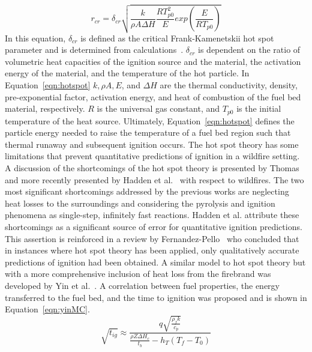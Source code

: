         \begin{equation}
            r_{cr} = \delta_{cr}\sqrt{\frac{k}{\rho A \Delta H}\frac{RT^{2}_{p0}}{E} exp\left(\frac{E}{RT_{p0}}  \right)}
            \label{eqn:hotspot}
        \end{equation}
    In this equation, $\delta_{cr}$ is defined as the critical Frank-Kamenetskii hot spot parameter and is determined from calculations~\cite{Goldshleger1973IgnitionDimensions}. $\delta_{cr}$ is dependent on the ratio of volumetric heat capacities of the ignition source and the material, the activation energy of the material, and the temperature of the hot particle. In Equation~\ref{eqn:hotspot} $k, \rho A, E$, and $\Delta H$ are the thermal conductivity, density, pre-exponential factor, activation energy, and heat of combustion of the fuel bed material, respectively. $R$ is the universal gas constant, and $T_{p0}$ is the initial temperature of the heat source. Ultimately, Equation~\ref{eqn:hotspot} defines the particle energy needed to raise the temperature of a fuel bed region such that thermal runaway and subsequent ignition occurs. The hot spot theory has some limitations that prevent quantitative predictions of ignition in a wildfire setting. A discussion of the shortcomings of the hot spot theory is presented by Thomas~\cite{Thomas1965} and more recently presented by Hadden et al.~\cite{Hadden2011} with respect to wildfires. The two most significant shortcomings addressed by the previous works are neglecting heat losses to the surroundings and considering the pyrolysis and ignition phenomena as single-step, infinitely fast reactions. Hadden et al. attribute these shortcomings as a significant source of error for quantitative ignition predictions. This assertion is reinforced in a review by Fernandez-Pello~\cite{Fernandez-Pello2017} who concluded that in instances where hot spot theory has been applied, only qualitatively accurate predictions of ignition had been obtained. A similar model to hot spot theory but with a more comprehensive inclusion of heat loss from the firebrand was developed by Yin et al.~\cite{Yin2014}. A correlation between fuel properties, the energy transferred to the fuel bed, and the time to ignition was proposed and is shown in Equation~\ref{eqn:yinMC}.
        \begin{equation}
            \sqrt{t_{ig}} \approx \frac{q\sqrt{\frac{\rho_{f}k}{c_{p}}}}{\frac{\rho Z \Delta H_c}{t_b}- h_T(T_f - T_0)}
            \label{eqn:yinMC}
        \end{equation}
